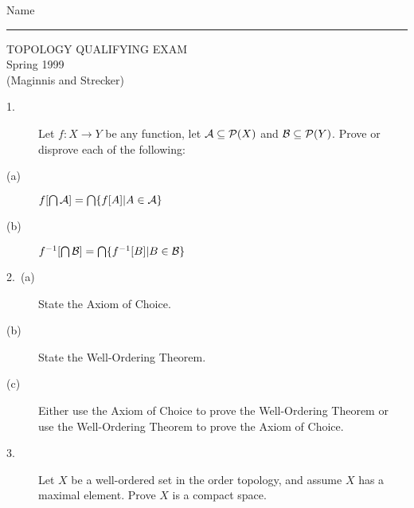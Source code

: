 \documentclass[bbb]{report}
\begin{document}

\begin{Large}

\hfill Name \rule{2.15in}{.01in}
\par
\vspace{.1in}

\begin{center}
   TOPOLOGY QUALIFYING EXAM \\
   Spring 1999 \\
   (Maginnis and Strecker) \\
\end{center}

\end{Large}

\vspace{.1in}

\begin{large}

\vspace{.2in}

\begin{description}

\item[1.]
Let $f:X\to Y$ be any function, let ${\cal A}\subseteq {\cal P}(X)$
and ${\cal B}\subseteq{\cal P}(Y)$. Prove or disprove each of the
following:

\item[\quad (a)]
$f[\bigcap {\cal A}]=\bigcap\{ f[A]|A\in{\cal A}\}$

\item[\quad (b)]
$f^{-1}[\bigcap {\cal B}]=\bigcap \{f^{-1}[B]|B\in{\cal B}\}$


\vspace{.15in}
\item[2.\ (a)]
State the Axiom of Choice.

\item[\quad (b)] State the Well-Ordering Theorem.

\item[\quad (c)] Either use the Axiom of Choice to prove the
Well-Ordering Theorem or use the Well-Ordering Theorem to prove the
Axiom of Choice.


\vspace{.15in}
\item[3.]
Let $X$ be a well-ordered set in the order topology, and assume
$X$ has a maximal element. Prove $X$ is a compact space.



\end{description}
\end{large}
\end{document}
